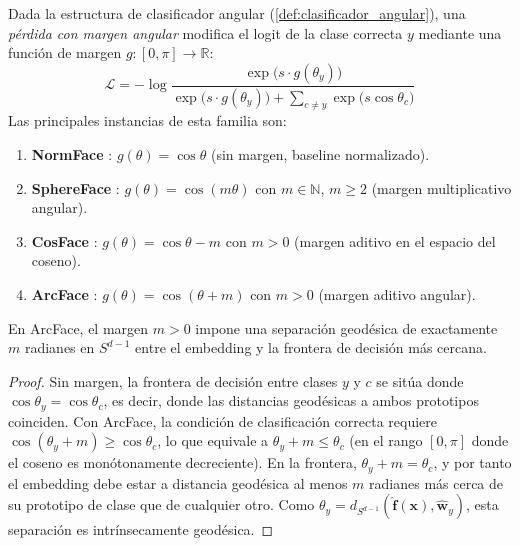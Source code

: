 \begin{definition}\label{def:perdida_margen_angular}
Dada la estructura de clasificador angular (\autoref{def:clasificador_angular}), una \textit{pérdida con margen angular} modifica el logit de la clase correcta $y$ mediante una función de margen $g: [0, \pi] \to \mathbb{R}$:
\begin{equation}
\mathcal{L} = -\log \frac{\exp\bigl(s \cdot g(\theta_y)\bigr)}{\exp\bigl(s \cdot g(\theta_y)\bigr) + \sum_{c \neq y} \exp\bigl(s \cos\theta_c\bigr)}
\label{eq:perdida_margen_angular}
\end{equation}
Las principales instancias de esta familia son:
\begin{enumerate}
    \item \textbf{NormFace} \citep{wang2017normface}: $g(\theta) = \cos\theta$ (sin margen, baseline normalizado).
    \item \textbf{SphereFace} \citep{liu2017sphereface}: $g(\theta) = \cos(m\theta)$ con $m \in \mathbb{N}$, $m \geq 2$ (margen multiplicativo angular).
    \item \textbf{CosFace} \citep{wang2018cosface}: $g(\theta) = \cos\theta - m$ con $m > 0$ (margen aditivo en el espacio del coseno).
    \item \textbf{ArcFace} \citep{deng2019arcface}: $g(\theta) = \cos(\theta + m)$ con $m > 0$ (margen aditivo angular).
\end{enumerate}
\end{definition}

\begin{proposition}\label{prop:interpretacion_geodesica_margen}
En ArcFace, el margen $m > 0$ impone una separación geodésica de exactamente $m$ radianes en $S^{d-1}$ entre el embedding y la frontera de decisión más cercana.
\end{proposition}

\begin{proof}
Sin margen, la frontera de decisión entre clases $y$ y $c$ se sitúa donde $\cos\theta_y = \cos\theta_c$, es decir, donde las distancias geodésicas a ambos prototipos coinciden. Con ArcFace, la condición de clasificación correcta requiere $\cos(\theta_y + m) \geq \cos\theta_c$, lo que equivale a $\theta_y + m \leq \theta_c$ (en el rango $[0, \pi]$ donde el coseno es monótonamente decreciente). En la frontera, $\theta_y + m = \theta_c$, y por tanto el embedding debe estar a distancia geodésica al menos $m$ radianes más cerca de su prototipo de clase que de cualquier otro. Como $\theta_y = d_{S^{d-1}}(\hat{\mathbf{f}}(\mathbf{x}), \hat{\mathbf{w}}_y)$, esta separación es intrínsecamente geodésica.
\end{proof}

